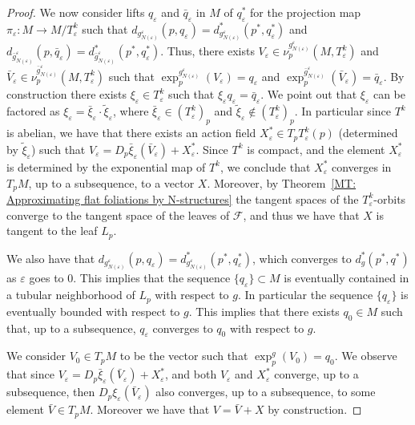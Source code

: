 \documentclass[12pt,a4paper,reqno]{amsart}
\theoremstyle{definition}
\numberwithin{equation}{section}
\newcommand{\fol}{\mathcal{F}}
\begin{document}
\begin{proof}
We now consider lifts $q_\varepsilon$ and $\bar{q}_\varepsilon$ in $M$ of $q^\ast_\varepsilon$ for the projection map $\pi_\varepsilon\colon M\to M/T^k_\varepsilon$ such that $d_{g^\varepsilon_{N(\varepsilon)}}(p,q_\varepsilon)= d^\ast_{g^\varepsilon_{N(\varepsilon)}}(p^\ast,q^\ast_\varepsilon)$ and $d_{\bar{g}^\varepsilon_{N(\varepsilon)}}(p,\bar{q}_\varepsilon)= d^\ast_{\bar{g}^\varepsilon_{N(\varepsilon)}}(p^\ast,q^\ast_\varepsilon)$. Thus, there exists $V_\varepsilon\in \nu^{g^\varepsilon_{N(\varepsilon)}}_p(M,T^k_\varepsilon)$ and $\bar{V}_\varepsilon\in \nu^{\bar{g}^\varepsilon_{N(\varepsilon)}}_p(M,T^k_\varepsilon)$ such that $\exp_p^{g^\varepsilon_{N(\varepsilon)}}(V_\varepsilon) =q_\varepsilon$ and $\exp_p^{\bar{g}^\varepsilon_{N(\varepsilon)}}(\bar{V}_\varepsilon) =\bar{q}_\varepsilon$. By construction there exists $\xi_\varepsilon\in T^k_\varepsilon$ such that $\xi_\varepsilon q_\varepsilon = \bar{q}_\varepsilon$. We point out that $\xi_\varepsilon$ can be factored as $\xi_\varepsilon=\bar{\xi}_\varepsilon\cdot\tilde{\xi}_\varepsilon$, where $\bar{\xi}_\varepsilon\in (T^k_\varepsilon)_p$ and $\tilde{\xi}_\varepsilon\not\in (T^k_\varepsilon)_p$. In particular  since $T^k$ is abelian, we have that there exists an action field $X^\ast_\varepsilon\in T_p T^k_\varepsilon(p)$ (determined by $\tilde{\xi}_\varepsilon$) such that  $V_\varepsilon = D_p\bar{\xi}_\varepsilon(\bar{V}_\varepsilon)+X_\varepsilon^\ast$. Since $T^k$ is compact, and the element $X^\ast_\varepsilon$ is determined by the exponential map of $T^k$, we conclude that $X^\ast_\varepsilon$  converges in $T_pM$, up to a subsequence, to a vector $X$. Moreover, by Theorem~\ref{MT: Approximating flat foliations by N-structures}  the tangent spaces of the $T^k_\varepsilon$-orbits converge to the tangent space of the leaves of $\fol$, and thus we have that $X$ is tangent to the leaf $L_p$. 

We also have that  $d_{g^\varepsilon_{N(\varepsilon)}}(p,q_\varepsilon) = d^\ast_{g^\varepsilon_{N(\varepsilon)}}(p^\ast,q^\ast_\varepsilon)$, which converges to $d^\ast_g(p^\ast,q^\ast)$ as $\varepsilon$ goes to $0$. This implies that the sequence $\{q_\varepsilon\}\subset M$ is eventually contained in a tubular neighborhood of $L_p$ with respect to $g$. In particular the sequence $\{q_\varepsilon\}$ is eventually bounded with respect to $g$. This implies that there exists $q_0\in M$ such that, up to a subsequence, $q_\varepsilon$ converges to $q_0$ with respect to $g$.

We consider $V_0\in T_p M$ to be the vector such that $\exp_p^g(V_0) =q_0$. We observe that since $V_\varepsilon = D_p\bar{\xi}_\varepsilon(\bar{V}_\varepsilon)+X^\ast_\varepsilon$, and both $V_\varepsilon$ and $X^\ast_\varepsilon$ converge, up to a subsequence, then $D_p\xi_\varepsilon(\bar{V}_\varepsilon)$ also converges, up to a subsequence, to some element $\bar{V}\in T_p M$. Moreover we have that $V = \bar{V}+X$ by construction. 


\end{proof}
\end{document}
